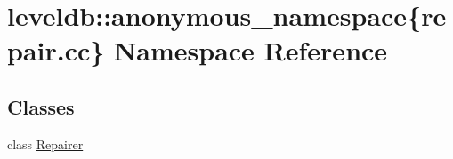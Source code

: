 \hypertarget{namespaceleveldb_1_1anonymous__namespace_02repair_8cc_03}{}\section{leveldb\+:\+:anonymous\+\_\+namespace\{repair.\+cc\} Namespace Reference}
\label{namespaceleveldb_1_1anonymous__namespace_02repair_8cc_03}
\subsection*{Classes}
\begin{DoxyCompactItemize}
\item 
class \hyperlink{classleveldb_1_1anonymous__namespace_02repair_8cc_03_1_1_repairer}{Repairer}
\end{DoxyCompactItemize}
